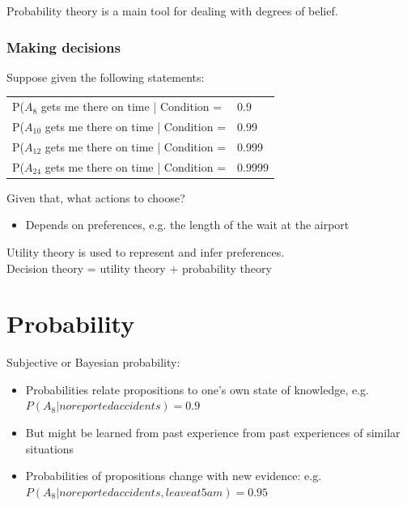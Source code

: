 Probability theory is a main tool for dealing with degrees of belief.\\

\subsubsection{Making decisions}
Suppose given the following statements:\\

\begin{table}[h]
\centering
\begin{tabular}{l l}
P($A_8$  gets me there on time | Condition = & 0.9\\
P($A_{10}$ gets me there on time | Condition = & 0.99\\
P($A_{12}$ gets me there on time | Condition = & 0.999\\
P($A_{24}$ gets me there on time | Condition = & 0.9999\\
\end{tabular}
\end{table}

Given that, what actions to choose?\\
\begin{itemize}
\item Depends on preferences, e.g. the length of the wait at the airport
\end{itemize}

Utility theory is used to represent and infer preferences.\\
Decision theory = utility theory + probability theory\\

\section{Probability}
Subjective or Bayesian probability:\\

\begin{itemize}
\item Probabilities relate propositions to one's own state of knowledge, e.g. $P(A_8 | no reported accidents) = 0.9$
\item But might be learned from past experience from past experiences of similar situations
\item Probabilities of propositions change with new evidence: e.g. $P(A_8|no reported accidents, leave at 5 am) = 0.95$
\end{itemize}


